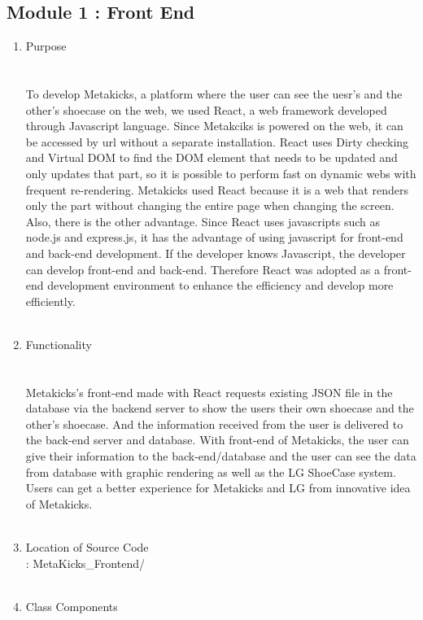 \documentclass[conference]{IEEEtran}
\begin{document}
\subsection{Module 1 : Front End}
\begin{enumerate}
\item Purpose\\
\\\\To develop Metakicks, a platform where the user can see the uesr's and the other's shoecase on the web, we used React, a web framework developed through Javascript language. Since Metakciks is powered on the web, it can be accessed by url without a separate installation. React uses Dirty checking and Virtual DOM to find the DOM element that needs to be updated and only updates that part, so it is possible to perform fast on dynamic webs with frequent re-rendering. Metakicks used React because it is a web that renders only the part without changing the entire page when changing the screen. Also, there is the other advantage. Since React uses javascripts such as node.js and express.js, it has the advantage of using javascript for front-end and back-end development. If the developer knows Javascript, the developer can develop front-end and back-end. Therefore React was adopted as a front-end development environment to enhance the efficiency and develop more efficiently.\\\\
\item Functionality\\
\\\\Metakicks's front-end made with React requests existing JSON file in the database via the backend server to show the users their own shoecase and the other's shoecase. And the information received from the user is delivered to the back-end server and database. With front-end of Metakicks, the user can give their information to the back-end/database and the user can see the data from database with graphic rendering as well as the LG ShoeCase system. Users can get a better experience for Metakicks and LG from innovative idea of Metakicks.\\\\
\item Location of Source Code\\
: MetaKicks\_Frontend/\\\\
\item Class Components\\

\end{enumerate}
\end{document}
